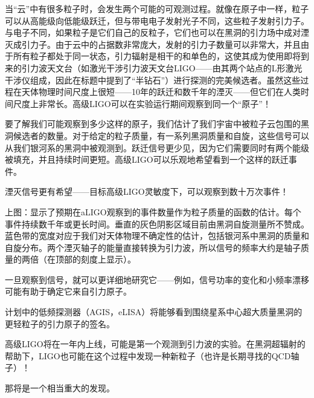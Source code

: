 当“云”中有很多粒子时，会发生两个可能的可观测过程。就像在原子中一样，粒子可以从高能级向低能级跃迁，但与带电电子发射光子不同，这些粒子发射引力子。与电子不同，如果粒子是它们自己的反粒子，它们也可以在黑洞的引力场中成对湮灭成引力子。由于云中的占据数非常庞大，发射的引力子数量可以非常大，并且由于所有粒子都处于同一状态，引力辐射是相干的和单色的，这使其成为使用即将到来的引力波天文台（如激光干涉引力波天文台LIGO——由其两个站点的L形激光干涉仪组成，因此在标题中提到了“半钻石”）进行探测的完美候选者。虽然这些过程在天体物理时间尺度上很短——10年的跃迁和数千年的湮灭——但它们在人类时间尺度上非常长。高级LIGO可以在实验运行期间观察到同一个“原子”！

要了解我们可能观察到多少这样的原子，我们估计了我们宇宙中被粒子云包围的黑洞候选者的数量。对于给定的粒子质量，有一系列黑洞质量和自旋，这些信号可以从我们银河系的黑洞中被观测到。跃迁信号更少见，因为它们需要同时有两个能级被填充，并且持续时间更短。高级LIGO可以乐观地希望看到一个这样的跃迁事件。

湮灭信号更有希望——目标高级LIGO灵敏度下，可以观察到数十万次事件！

上图：显示了预期在aLIGO观察到的事件数量作为粒子质量的函数的估计。每个事件持续数千年或更长时间。垂直的灰色阴影区域目前由黑洞自旋测量所不赞成。蓝色带的宽度对应于我们对天体物理不确定性的估计，包括银河系中黑洞的质量和自旋分布。两个湮灭轴子的能量直接转换为引力波，所以信号的频率大约是轴子质量的两倍（在顶部的刻度上显示）。

一旦观察到信号，就可以更详细地研究它——例如，信号功率的变化和小频率漂移可能有助于确定它来自引力原子。

计划中的低频探测器（AGIS，eLISA）将能够看到围绕星系中心超大质量黑洞的更轻粒子的引力原子的签名。

高级LIGO将在一年内上线，可能是第一个观测到引力波的实验。在黑洞超辐射的帮助下，LIGO也可能在这个过程中发现一种新粒子（也许是长期寻找的QCD轴子）！

那将是一个相当重大的发现。





